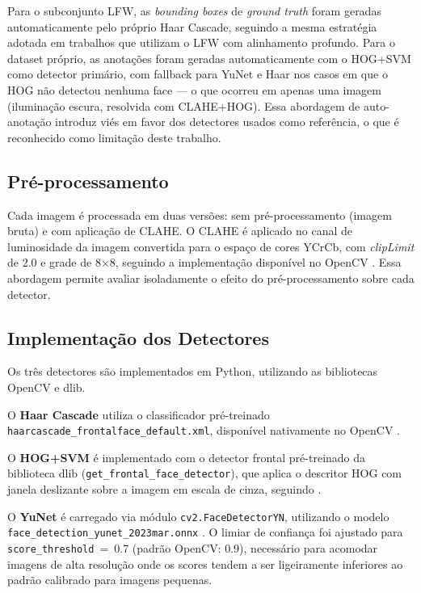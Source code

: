 \documentclass[conference]{IEEEtran}
\begin{document}
Para o subconjunto LFW, as \textit{bounding boxes} de \textit{ground truth} foram geradas automaticamente pelo pr\'oprio Haar Cascade, seguindo a mesma estrat\'egia adotada em trabalhos que utilizam o LFW com alinhamento profundo. Para o dataset pr\'oprio, as anota\c{c}\~oes foram geradas automaticamente com o HOG+SVM como detector prim\'ario, com fallback para YuNet e Haar nos casos em que o HOG n\~ao detectou nenhuma face --- o que ocorreu em apenas uma imagem (ilumina\c{c}\~ao escura, resolvida com CLAHE+HOG). Essa abordagem de auto-anota\c{c}\~ao introduz vi\'es em favor dos detectores usados como refer\^encia, o que \'e reconhecido como limita\c{c}\~ao deste trabalho.

\subsection{Pr\'e-processamento}

Cada imagem \'e processada em duas vers\~oes: sem pr\'e-processamento (imagem bruta) e com aplica\c{c}\~ao de CLAHE. O CLAHE \'e aplicado no canal de luminosidade da imagem convertida para o espa\c{c}o de cores YCrCb, com \textit{clipLimit} de 2.0 e grade de 8$\times$8, seguindo a implementa\c{c}\~ao disponível no OpenCV \cite{Zuiderveld1994}. Essa abordagem permite avaliar isoladamente o efeito do pr\'e-processamento sobre cada detector.

\subsection{Implementa\c{c}\~ao dos Detectores}

Os tr\^es detectores s\~ao implementados em Python, utilizando as bibliotecas OpenCV e dlib.

O \textbf{Haar Cascade} utiliza o classificador pr\'e-treinado \texttt{haarcascade\_frontalface\_default.xml}, dispon\'ivel nativamente no OpenCV \cite{ViolaJones2001}.

O \textbf{HOG+SVM} \'e implementado com o detector frontal pr\'e-treinado da biblioteca dlib (\texttt{get\_frontal\_face\_detector}), que aplica o descritor HOG com janela deslizante sobre a imagem em escala de cinza, seguindo \cite{DalalTriggs2005}.

O \textbf{YuNet} \'e carregado via m\'odulo \texttt{cv2.FaceDetectorYN}, utilizando o modelo \texttt{face\_detection\_yunet\_2023mar.onnx} \cite{Wu2023}. O limiar de confian\c{c}a foi ajustado para \texttt{score\_threshold}~=~0.7 (padr\~ao OpenCV: 0.9), necess\'ario para acomodar imagens de alta resolu\c{c}\~ao onde os scores tendem a ser ligeiramente inferiores ao padr\~ao calibrado para imagens pequenas.
\end{document}
